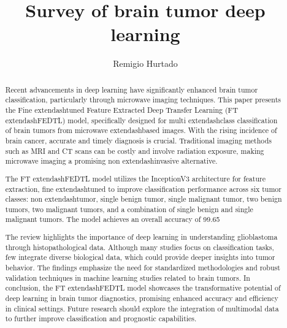 \documentclass[runningheads]{llncs}
\begin{document}
%
\title{Survey of brain tumor deep learning}
%
%
\author{Remigio Hurtado}
%
%
%
\maketitle    
%
\begin{abstract}
Recent advancements in deep learning have significantly enhanced brain tumor classification, particularly through microwave imaging techniques. This paper presents the Fine	extendash{}tuned Feature Extracted Deep Transfer Learning (FT	extendash{}FEDTL) model, specifically designed for multi	extendash{}class classification of brain tumors from microwave	extendash{}based images. With the rising incidence of brain cancer, accurate and timely diagnosis is crucial. Traditional imaging methods such as MRI and CT scans can be costly and involve radiation exposure, making microwave imaging a promising non	extendash{}invasive alternative. 

The FT	extendash{}FEDTL model utilizes the InceptionV3 architecture for feature extraction, fine	extendash{}tuned to improve classification performance across six tumor classes: non	extendash{}tumor, single benign tumor, single malignant tumor, two benign tumors, two malignant tumors, and a combination of single benign and single malignant tumors. The model achieves an overall accuracy of 99.65%

The review highlights the importance of deep learning in understanding glioblastoma through histopathological data. Although many studies focus on classification tasks, few integrate diverse biological data, which could provide deeper insights into tumor behavior. The findings emphasize the need for standardized methodologies and robust validation techniques in machine learning studies related to brain tumors. In conclusion, the FT	extendash{}FEDTL model showcases the transformative potential of deep learning in brain tumor diagnostics, promising enhanced accuracy and efficiency in clinical settings. Future research should explore the integration of multimodal data to further improve classification and prognostic capabilities.
\end{abstract}
\end{document}
